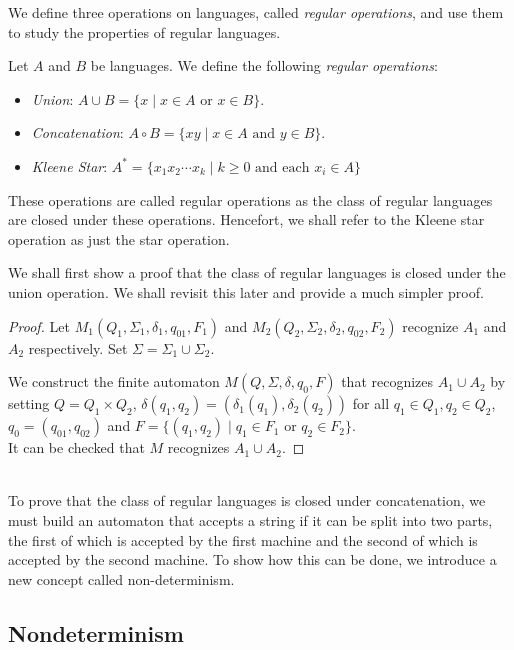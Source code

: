 We define three operations on languages, called \textit{regular operations}, and use them to study the properties of regular languages.

\begin{definition}
Let $A$ and $B$ be languages. We define the following \textit{regular operations}:
\begin{itemize}
    \item \textit{Union}: $A\cup B=\{x\mid x\in A \text{ or }x\in B\}$.
    \item \textit{Concatenation}: $A\circ B=\{xy\mid x\in A\text{ and }y\in B\}$.
    \item \textit{Kleene Star}: $A^*=\{x_1x_2\cdots x_k\mid k\geq 0\text{ and each }x_i\in A\}$
\end{itemize}
\end{definition}

These operations are called regular operations as the class of regular languages are closed under these operations. Hencefort, we shall refer to the Kleene star operation as just the star operation.

\vspace{2mm}
We shall first show a proof that the class of regular languages is closed under the union operation. We shall revisit this later and provide a much simpler proof.
\begin{proof}
Let $M_1(Q_1,\Sigma_1,\delta_1,q_{01},F_1)$ and $M_2(Q_2,\Sigma_2,\delta_2,q_{02},F_2)$ recognize $A_1$ and $A_2$ respectively. Set $\Sigma=\Sigma_1\cup\Sigma_2$.

We construct the finite automaton $M(Q,\Sigma,\delta,q_0,F)$ that recognizes $A_1\cup A_2$ by setting $Q=Q_1\times Q_2$, $\delta(q_1, q_2)=(\delta_1(q_1), \delta_2(q_2))$ for all $q_1\in Q_1,q_2\in Q_2$, $q_0=(q_{01}, q_{02})$ and $F=\{(q_1, q_2)\mid q_1\in F_1 \text{ or }q_2\in F_2\}$.\\
It can be checked that $M$ recognizes $A_1\cup A_2$.
\end{proof}
~\\
To prove that the class of regular languages is closed under concatenation, we must build an automaton that accepts a string if it can be split into two parts, the first of which is accepted by the first machine and the second of which is accepted by the second machine. To show how this can be done, we introduce a new concept called non-determinism.
\clearpage

\subsection{Nondeterminism}

